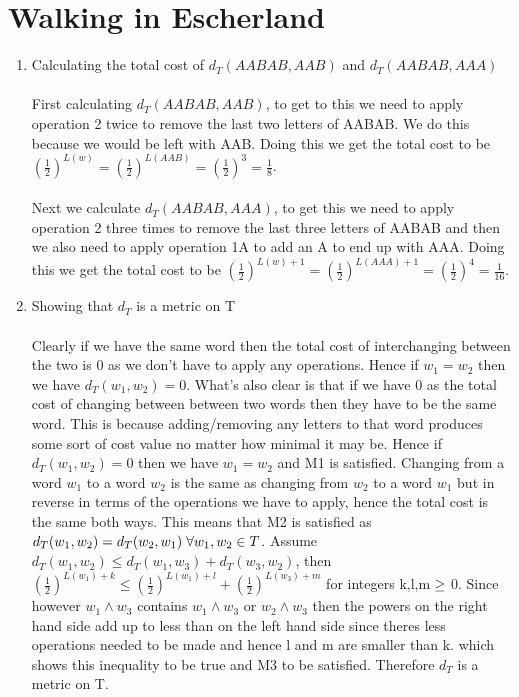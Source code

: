 \documentclass[,oneside]{article}
\numberwithin{equation}{section}
\begin{document}
\section{\large{Walking in Escherland}}
\begin{enumerate}[label=(\roman*)]
\item Calculating the total cost of $d_T(AABAB, AAB)$ and $d_T(AABAB, AAA)$\\
\\First calculating $d_T(AABAB,AAB)$, to get to this we need to apply operation 2 twice to remove the last two letters of AABAB. We do this because we would be left with AAB. Doing this we get the total cost to be $(\frac{1}{2})^{L(w)} = (\frac{1}{2})^{L(AAB)} = (\frac{1}{2})^3 = \frac{1}{8}$.\\
\\Next we calculate $d_T(AABAB, AAA)$, to get this we need to apply operation 2 three times to remove the last three letters of AABAB and then we also need to apply operation 1A to add an A to end up with AAA. Doing this we get the total cost to be $(\frac{1}{2})^{L(w)+1} = (\frac{1}{2})^{L(AAA)+1} = (\frac{1}{2})^4 = \frac{1}{16}$.\\

\item Showing that $d_T$ is a metric on T\\
\\Clearly if we have the same word then the total cost of interchanging between the two is 0 as we don't have to apply any operations. Hence if $w_1=w_2$ then we have $d_T(w_1,w_2)=0$. What's also clear is that if we have 0 as the total cost of changing between between two words then they have to be the same word. This is because adding/removing any letters to that word produces some sort of cost value no matter how minimal it may be. Hence if $d_T(w_1,w_2)=0$ then we have $w_1=w_2$ and M1 is satisfied. Changing from a word $w_1$ to a word $w_2$ is the same as changing from $w_2$ to a word $w_1$ but in reverse in terms of the operations we have to apply, hence the total cost is the same both ways. This means that M2 is satisfied as $d_T(w_1,w_2)=d_T(w_2,w_1) \hspace{0.1cm} \forall w_1,w_2 \in T$. Assume $d_T(w_1,w_2) \leq d_T(w_1, w_3) + d_T(w_3,w_2)$, then $(\frac{1}{2})^{L(w_1)+k} \leq (\frac{1}{2})^{L(w_1)+l} + (\frac{1}{2})^{L(w_3)+m}$ for integers k,l,m$\hspace{0.1cm}\geq$ 0. Since however $w_1 \wedge w_3$ contains $w_1 \wedge w_3$ or $w_2 \wedge w_3$ then the powers on the right hand side add up to less than on the left hand side since theres less operations needed to be made and hence l and m are smaller than k. which shows this inequality to be true and M3 to be satisfied. Therefore $d_T$ is a metric on T.


\end{enumerate}
\end{document}
